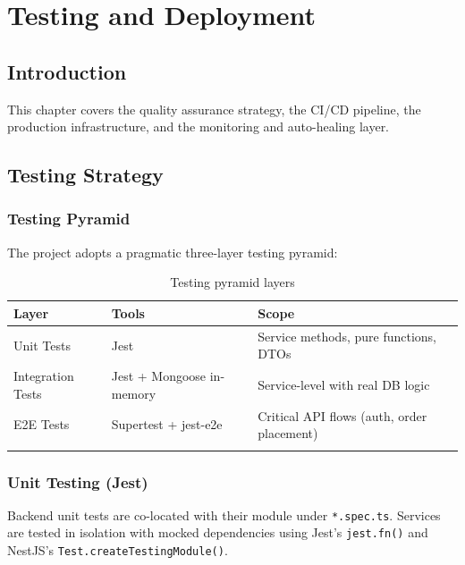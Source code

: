 
\chapter{Testing and Deployment}

\section*{Introduction}
This chapter covers the quality assurance strategy, the CI/CD pipeline, the
production infrastructure, and the monitoring and auto-healing layer.

\section{Testing Strategy}

\subsection{Testing Pyramid}

The project adopts a pragmatic three-layer testing pyramid:

\begin{longtable}{|m{3.5cm}|m{3cm}|m{7cm}|}
    \hline
    \textbf{Layer}    & \textbf{Tools}            & \textbf{Scope}                             \\
    \hline
    \endhead
    \endfoot
    \endlastfoot
    \hline
    Unit Tests        & Jest                      & Service methods, pure functions, DTOs      \\
    \hline
    Integration Tests & Jest + Mongoose in-memory & Service-level with real DB logic           \\
    \hline
    E2E Tests         & Supertest + jest-e2e      & Critical API flows (auth, order placement) \\
    \hline
    \caption{Testing pyramid layers}
    \label{tab:testing_pyramid}
\end{longtable}

\subsection{Unit Testing (Jest)}

Backend unit tests are co-located with their module under \texttt{*.spec.ts}.
Services are tested in isolation with mocked dependencies using Jest's
\texttt{jest.fn()} and NestJS's \texttt{Test.createTestingModule()}.

